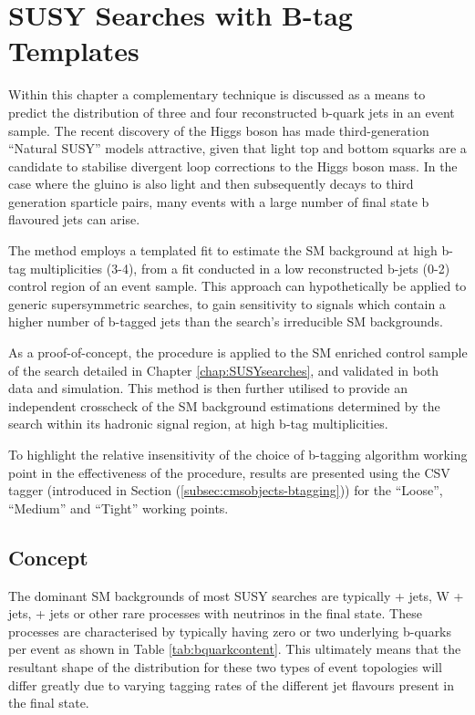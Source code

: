\chapter{SUSY Searches with B-tag Templates}
\label{chap:templatemethod}


Within this chapter a complementary technique is discussed as a means to predict the distribution of three and four reconstructed b-quark jets in an event sample. The recent discovery of the Higgs boson has made third-generation ``Natural \ac{SUSY}'' models attractive, given that light top and bottom squarks are a candidate to stabilise divergent loop corrections to the Higgs boson mass. In the case where the gluino is also light and then subsequently decays to third generation sparticle pairs, many events with a large number of final state b flavoured jets can arise.

The method employs a templated fit to estimate the \ac{SM} background at high b-tag multiplicities (3-4), from a fit conducted in a low reconstructed b-jets (0-2) control region of an event sample. This approach can hypothetically be applied to generic supersymmetric searches, to gain sensitivity to signals which contain a higher number of b-tagged jets than the search's irreducible \ac{SM} backgrounds. 

As a proof-of-concept, the procedure is applied to the \ac{SM} enriched \mupjets control sample of the \alphat search detailed in Chapter \ref{chap:SUSYsearches}, and validated in both data and simulation. This method is then further utilised to provide an independent crosscheck of the \ac{SM} background estimations determined by the \alphat search within its hadronic signal region, at high b-tag multiplicities.

To highlight the relative insensitivity of the choice of b-tagging algorithm working point in the effectiveness of the procedure, results are presented using the \ac{CSV} tagger (introduced in Section (\ref{subsec:cmsobjects-btagging})) for the ``Loose'', ``Medium'' and ``Tight'' working points.

\section{Concept}
\label{sec:templateconcept}

The dominant \ac{SM} backgrounds of most \ac{SUSY} searches are typically \ttbar + jets, W + jets, \zinv + jets or other rare processes with neutrinos in the final state. These processes are characterised by typically having zero or two underlying b-quarks per event as shown in Table \ref{tab:bquarkcontent}. This ultimately means that the resultant shape of the \nbreco distribution for these two types of event topologies will differ greatly due to varying tagging rates of the different jet flavours present in the final state.  

